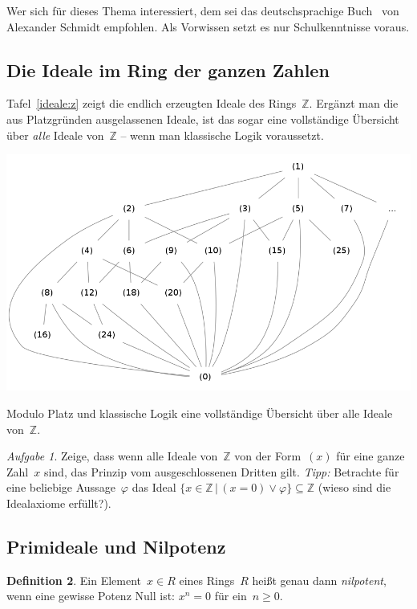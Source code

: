 \documentclass[a4paper,ngerman,12pt]{scrartcl}
\theoremstyle{definition}
\newtheorem{defn}{Definition}[section]
\theoremstyle{plain}
\theoremstyle{remark}
\newtheorem{aufg}[defn]{Aufgabe}
\newcommand{\ZZ}{\mathbb{Z}}
\renewcommand{\_}{\mathpunct{.}\,}
\newcommand{\?}{\,{:}\,}
\begin{document}
Wer sich für dieses Thema interessiert, dem sei das deutschsprachige
Buch~\cite{schmidt:zahlentheorie} von Alexander Schmidt empfohlen. Als Vorwissen
setzt es nur Schulkenntnisse voraus.


\subsection{Die Ideale im Ring der ganzen Zahlen}

Tafel~\ref{ideale:z} zeigt die endlich erzeugten Ideale des Rings~$\ZZ$.
Ergänzt man die aus Platzgründen ausgelassenen Ideale, ist das
sogar eine vollständige Übersicht über \emph{alle} Ideale von~$\ZZ$ --
wenn man klassische Logik voraussetzt.

\begin{table}
  \centering
  \includegraphics[scale=0.4]{ideale-z}
  \caption{\label{ideale:z}Modulo Platz und klassische Logik eine
  vollständige Übersicht über alle Ideale von~$\ZZ$.}
\end{table}

\begin{aufg}Zeige, dass wenn alle Ideale von~$\ZZ$ von der Form~$(x)$ für
eine ganze Zahl~$x$ sind, das Prinzip vom ausgeschlossenen Dritten gilt.
\emph{Tipp:} Betrachte für eine beliebige Aussage~$\varphi$ das Ideal
$\{ x \in \ZZ \,|\, (x = 0) \vee \varphi \} \subseteq \ZZ$ (wieso
sind die Idealaxiome erfüllt?).\end{aufg}


\subsection{Primideale und Nilpotenz}

\begin{defn}Ein Element~$x \in R$ eines Rings~$R$ heißt genau dann
\emph{nilpotent}, wenn eine gewisse Potenz Null ist:
$x^n = 0$ für ein~$n \geq 0$.
\end{defn}
\end{document}
